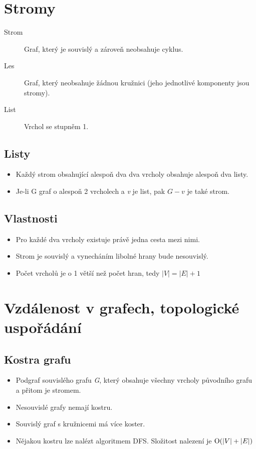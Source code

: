 \section{Stromy}
  \begin{description}
    \item[Strom] Graf, který je souvislý a zároveň neobsahuje cyklus.
    \item[Les] Graf, který neobsahuje žádnou kružnici (jeho jednotlivé komponenty jsou stromy).
    \item[List] Vrchol se stupněm 1.
  \end{description}

  \subsection{Listy}
    \begin{itemize}
      \item Každý strom obsahující alespoň dva dva vrcholy obsahuje alespoň dva listy.
      \item Je-li G graf o alespoň 2 vrcholech a \emph{v} je list, pak $G - v$ je také strom.
    \end{itemize}

  \subsection{Vlastnosti}
    \begin{itemize}
      \item Pro každé dva vrcholy existuje právě jedna cesta mezi nimi.
      \item Strom je souvislý a vynecháním libolné hrany bude nesouvislý.
      \item Počet vrcholů je o 1 větší než počet hran, tedy $|V| = |E| + 1$
    \end{itemize}

\section{Vzdálenost v grafech, topologické uspořádání}

  \subsection{Kostra grafu}
    \begin{itemize}
      \item Podgraf souvislého grafu \emph{G}, který obsahuje všechny vrcholy původního grafu a přitom je stromem.
      \item Nesouvislé grafy nemají kostru.
      \item Souvislý graf s kružnicemi má více koster.
      \item Nějakou kostru lze nalézt algoritmem DFS. Složitost nalezení je $\textrm O(|V| + |E|)$
    \end{itemize}


